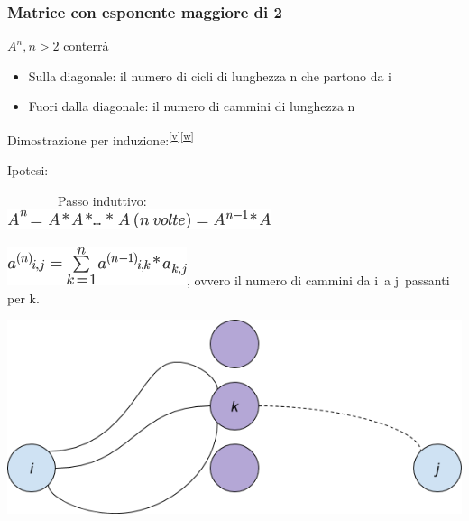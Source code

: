 \documentclass{article}
\providecommand{\tightlist}{%
  \setlength{\itemsep}{0pt}\setlength{\parskip}{0pt}}
\begin{document}
{{\subsubsection{Matrice con esponente maggiore di 2}

{$A^n, n > 2$ conterrà}

\begin{itemize}
\tightlist
\item
  {Sulla diagonale: il numero di cicli di lunghezza n che partono da i}
\item
  {Fuori dalla diagonale: il numero di cammini di lunghezza n}
\end{itemize}

{}

{Dimostrazione per
induzione:}\textsuperscript{\protect\hyperlink{cmnt22}{{[}v{]}}\protect\hyperlink{cmnt23}{{[}w{]}}}

{Ipotesi:}

{~~~~~~~~Passo induttivo:\\
\hspace*{0.333em}\hspace*{0.333em}\hspace*{0.333em}\hspace*{0.333em}\hspace*{0.333em}\hspace*{0.333em}\hspace*{0.333em}\hspace*{0.333em}\hspace*{0.333em}\hspace*{0.333em}\hspace*{0.333em}\hspace*{0.333em}\hspace*{0.333em}\hspace*{0.333em}\hspace*{0.333em}\hspace*{0.333em}}\includegraphics{images/image418.png}

\includegraphics{images/image419.png}{, ovvero il
numero di cammini da }{i}{~a }{j}{~passanti per }{k}{.}

{\includegraphics{images/image538.png}}

}}
\end{document}
